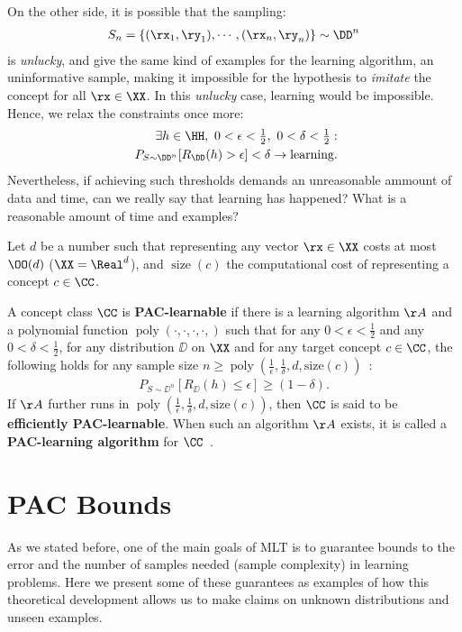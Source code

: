 On the other side, it is possible that the sampling:
\begin{align}
	S_n = \{(\rx_1,\ry_1), \cdots, (\rx_n, \ry_n)\} \sim \DD^n
\end{align}
is \emph{unlucky}, and give the same kind of examples for the learning algorithm, an uninformative sample, making it impossible for the hypothesis to \emph{imitate} the concept for all \(\rx \in \XX\). In this \emph{unlucky} case, learning would be impossible. Hence, we relax the constraints once more:
\begin{align}
	\exists h \in \HH, ~0 < \epsilon < \tfrac{1}{2}, ~0 < \delta < \tfrac{1}{2}: \nonumber\\
	~P_{S \sim \DD^n}[R_{\DD}(h) > \epsilon] < \delta \to \text{learning}.
\end{align}
Nevertheless, if achieving such thresholds demands an unreasonable ammount of data and time, can we really say that learning has happened? What is a reasonable amount of time and examples?

Let \(d\) be a number such that representing any vector \(\rx \in \XX\) costs at most \(\OO(d)\) (\eg \(\XX = \Real^d\)), and \(\operatorname{size}(c)\) the computational cost of representing a concept \(c \in \CC\).
\begin{definition}
	A concept class \(\CC\) is \textbf{PAC-learnable} if there is a learning algorithm \(\AA\) and a polynomial function \(\operatorname{poly}(\cdot,\cdot, \cdot, \cdot, )\) such that for any \(0< \epsilon < \tfrac{1}{2}\) and any \(0< \delta < \tfrac{1}{2}\), for any distribution \(\DD\) on \(\XX\) and for any target concept \(c \in \CC\), the following holds for any sample size \(n \geq \operatorname{poly}(\tfrac{1}{\epsilon}, \tfrac{1}{\delta}, d, \text{size}(c))\)~\cite{mohri:2012}:
	\begin{align}
		P_{S \sim \DD^n}[R_{\DD}(h) \leq \epsilon] \geq (1 - \delta).
	\end{align}
	If \(\AA\) further runs in \(\operatorname{poly}(\tfrac{1}{\epsilon}, \tfrac{1}{\delta}, d, \text{size}(c))\), then \(\CC\) is said to be \textbf{efficiently PAC-learnable}. When such an algorithm \(\AA\) exists, it is called a \textbf{PAC-learning algorithm} for \(\CC\)~\cite{mohri:2012}.
\end{definition}


\section{PAC Bounds}
As we stated before, one of the main goals of \ac{MLT} is to guarantee bounds to the error and the number of samples needed (sample complexity) in learning problems. Here we present some of these guarantees as examples of how this theoretical development allows us to make claims on unknown distributions and unseen examples.
